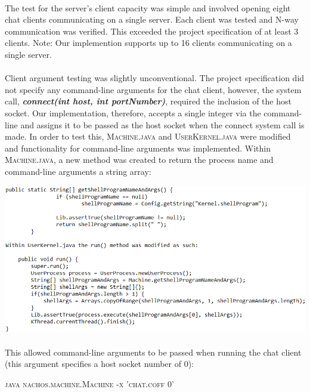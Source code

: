 \documentclass[12pt]{article}
\begin{document}
{\paragraph{} The test for the server's client capacity was simple and involved opening eight chat clients communicating on a single server. Each client was tested and N-way communication was verified. This exceeded the project specification of at least 3 clients. Note: Our implemention supports up to 16 clients communicating on a single server.
\paragraph{} Client argument testing was slightly unconventional. The project specification did not specify any command-line arguments for the chat client, however, the system call, \textbf{\textit{connect(int host, int portNumber)}}, required the inclusion of the host socket. Our implementation, therefore, accepts a single integer via the command-line and assigns it to be passed as the host socket when the connect system call is made. In order to test this, \textsc{Machine.java} and \textsc{UserKernel.java} were modified and functionality for command-line arguments was implemented. Within \textsc{Machine.java}, a new method was created to return the process name and command-line arguments a string array:
\begin{center}
    \includegraphics[width=160mm]{Task2Tests.png}
\end{center}
\paragraph{} This allowed command-line arguments to be passed when running the chat client (this argument specifies a host socket number of 0):
	\begin{center} \textsc{java nachos.machine.Machine -x 'chat.coff 0'} \end{center}
}
\end{document}
